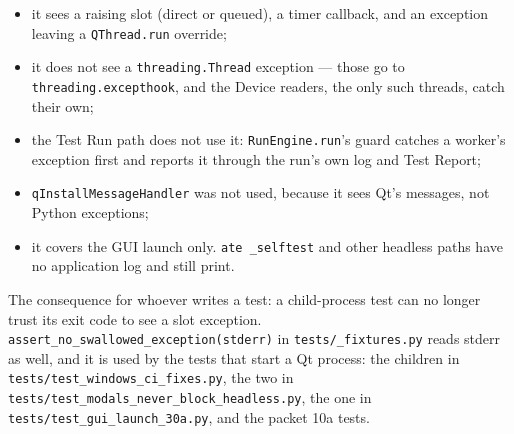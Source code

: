 \begin{itemize}
  \item it sees a raising slot (direct or queued), a timer callback, and an exception leaving a
    \texttt{QThread.run} override;
  \item it does not see a \texttt{threading.Thread} exception --- those go to \texttt{threading.excepthook},
    and the Device readers, the only such threads, catch their own;
  \item the Test Run path does not use it: \texttt{RunEngine.run}'s guard catches a worker's exception
    first and reports it through the run's own log and Test Report;
  \item \texttt{qInstallMessageHandler} was not used, because it sees Qt's messages, not Python
    exceptions;
  \item it covers the GUI launch only. \texttt{ate \_selftest} and other headless paths have no
    application log and still print.
\end{itemize}

The consequence for whoever writes a test: a child-process test can no longer trust its exit code to see
a slot exception. \texttt{assert\_\allowbreak{}no\_\allowbreak{}swallowed\_\allowbreak{}exception(stderr)} in \texttt{tests/\_fixtures.py} reads
stderr as well, and it is used by the tests that start a Qt process: the children in
\texttt{tests/\allowbreak{}test\_\allowbreak{}windows\_\allowbreak{}ci\_\allowbreak{}fixes.py}, the two in
\texttt{tests/\allowbreak{}test\_\allowbreak{}modals\_\allowbreak{}never\_\allowbreak{}block\_\allowbreak{}headless.py}, the one in
\texttt{tests/\allowbreak{}test\_\allowbreak{}gui\_\allowbreak{}launch\_\allowbreak30a.py}, and the packet 10a tests.


